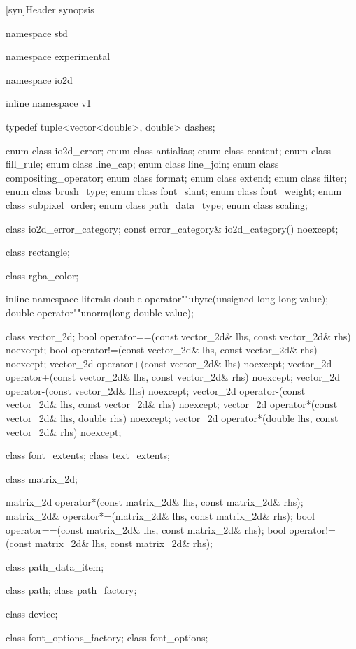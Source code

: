 [syn]{Header  synopsis}

%
\begin{codeblock}

namespace std { namespace experimental { namespace io2d { inline namespace v1 {
  typedef tuple<vector<double>, double> dashes;

  enum class io2d_error;
  enum class antialias;
  enum class content;
  enum class fill_rule;
  enum class line_cap;
  enum class line_join;
  enum class compositing_operator;
  enum class format;
  enum class extend;
  enum class filter;
  enum class brush_type;
  enum class font_slant;
  enum class font_weight;
  enum class subpixel_order;
  enum class path_data_type;
  enum class scaling;

  class io2d_error_category;
  const error_category& io2d_category() noexcept;

  class rectangle;

  class rgba_color;

  inline namespace literals {
    double operator""ubyte(unsigned long long value);
    double operator""unorm(long double value);
  }
  
  class vector_2d;
  bool operator==(const vector_2d& lhs, const vector_2d& rhs) noexcept;
  bool operator!=(const vector_2d& lhs, const vector_2d& rhs) noexcept;
  vector_2d operator+(const vector_2d& lhs) noexcept;
  vector_2d operator+(const vector_2d& lhs, const vector_2d& rhs) noexcept;
  vector_2d operator-(const vector_2d& lhs) noexcept;
  vector_2d operator-(const vector_2d& lhs, const vector_2d& rhs) noexcept;
  vector_2d operator*(const vector_2d& lhs, double rhs) noexcept;
  vector_2d operator*(double lhs, const vector_2d& rhs) noexcept;

  class font_extents;
  class text_extents;

  class matrix_2d;

  matrix_2d operator*(const matrix_2d& lhs, const matrix_2d& rhs);
  matrix_2d& operator*=(matrix_2d& lhs, const matrix_2d& rhs);
  bool operator==(const matrix_2d& lhs, const matrix_2d& rhs);
  bool operator!=(const matrix_2d& lhs, const matrix_2d& rhs);

  class path_data_item;

  class path;
  class path_factory;
  
  class device;

  class font_options_factory;
  class font_options;

}}}}
\end{codeblock}
